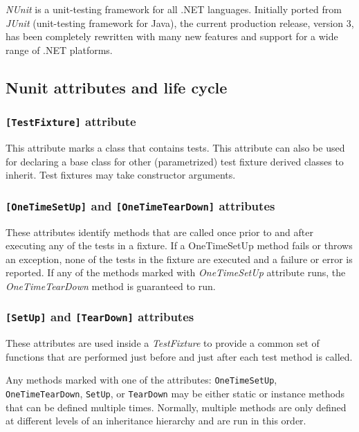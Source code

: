 \documentclass[
  print,
  table,
  nolof,
  nolot,
  nocover,
  oneside
]{fithesis3}
\begin{document}
\textit{NUnit} is a unit-testing framework for all .NET languages. Initially ported from \textit{JUnit} (unit-testing framework for Java), the current production release, version 3, has been completely rewritten with many new features and support for a wide range of .NET platforms.

\subsection{Nunit attributes and life cycle}
\label{nunit attributes}

\subsubsection{\texttt{[TestFixture]} attribute} 
This attribute marks a class that contains tests. This attribute can also be used for declaring a base class for other (parametrized) test fixture derived classes to inherit. Test fixtures may take constructor arguments.

\subsubsection{\texttt{[OneTimeSetUp]} and \texttt{[OneTimeTearDown]} attributes} 
These attributes identify methods that are called once prior to and after executing any of the tests in a fixture. If a OneTimeSetUp method fails or throws an exception, none of the tests in the fixture are executed and a failure or error is reported. If any of the methods marked with \textit{OneTimeSetUp} attribute runs, the \textit{OneTimeTearDown} method is guaranteed to run.

\subsubsection{\texttt{[SetUp]} and \texttt{[TearDown]} attributes}
These attributes are used inside a \textit{TestFixture} to provide a common set of functions that are performed just before and just after each test method is called.

Any methods marked with one of the attributes: \texttt{OneTimeSetUp}, \texttt{OneTimeTearDown}, \texttt{SetUp}, or \texttt{TearDown} may be either static or instance methods that can be defined multiple times. Normally, multiple methods are only defined at different levels of an inheritance hierarchy and are run in this order.
\end{document}
